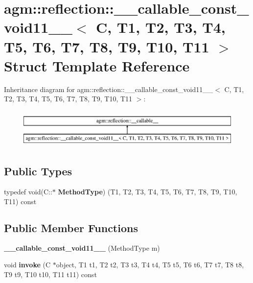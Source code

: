 \hypertarget{structagm_1_1reflection_1_1____callable__const__void11____}{}\section{agm\+:\+:reflection\+:\+:\+\_\+\+\_\+callable\+\_\+const\+\_\+void11\+\_\+\+\_\+$<$ C, T1, T2, T3, T4, T5, T6, T7, T8, T9, T10, T11 $>$ Struct Template Reference}
\label{structagm_1_1reflection_1_1____callable__const__void11____}
Inheritance diagram for agm\+:\+:reflection\+:\+:\+\_\+\+\_\+callable\+\_\+const\+\_\+void11\+\_\+\+\_\+$<$ C, T1, T2, T3, T4, T5, T6, T7, T8, T9, T10, T11 $>$\+:\begin{figure}[H]
\begin{center}
\leavevmode
\includegraphics[height=1.992882cm]{structagm_1_1reflection_1_1____callable__const__void11____}
\end{center}
\end{figure}
\subsection*{Public Types}
\begin{DoxyCompactItemize}
\item 
typedef void(C\+::$\ast$ {\bfseries Method\+Type}) (T1, T2, T3, T4, T5, T6, T7, T8, T9, T10, T11) const \hypertarget{structagm_1_1reflection_1_1____callable__const__void11_____a7b49286bcfb0da4c281b5656932352ea}{}\label{structagm_1_1reflection_1_1____callable__const__void11_____a7b49286bcfb0da4c281b5656932352ea}

\end{DoxyCompactItemize}
\subsection*{Public Member Functions}
\begin{DoxyCompactItemize}
\item 
{\bfseries \+\_\+\+\_\+callable\+\_\+const\+\_\+void11\+\_\+\+\_\+} (Method\+Type m)\hypertarget{structagm_1_1reflection_1_1____callable__const__void11_____af8bfb48c23c1062a68914dc21baad05d}{}\label{structagm_1_1reflection_1_1____callable__const__void11_____af8bfb48c23c1062a68914dc21baad05d}

\item 
void {\bfseries invoke} (C $\ast$object, T1 t1, T2 t2, T3 t3, T4 t4, T5 t5, T6 t6, T7 t7, T8 t8, T9 t9, T10 t10, T11 t11) const \hypertarget{structagm_1_1reflection_1_1____callable__const__void11_____acf94d4de693dba73b35a9324c9bc1d92}{}\label{structagm_1_1reflection_1_1____callable__const__void11_____acf94d4de693dba73b35a9324c9bc1d92}

\end{DoxyCompactItemize}
